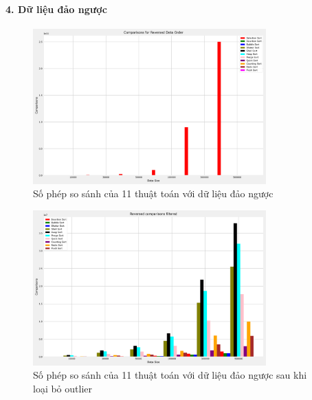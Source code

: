 \paragraph{4. Dữ liệu đảo ngược}
\begin{figure}[H]
    \centering
    \includegraphics[width=0.8\textwidth]{exprimental_result/images/reversed_comparisons.png}
    \caption{Số phép so sánh của 11 thuật toán với dữ liệu đảo ngược}
\end{figure}

\begin{figure}[H]
    \centering
    \includegraphics[width=0.8\textwidth]{exprimental_result/images/reversed_comparisons_filtered.png}
    \caption{
        Số phép so sánh của 11 thuật toán với dữ liệu đảo ngược sau khi loại bỏ outlier
    }
\end{figure}